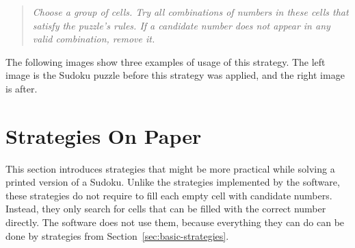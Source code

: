 \begin{quote}
    \textit{
        Choose a group of cells.
        Try all combinations of numbers in these cells that satisfy the puzzle's rules.
        If a candidate number does not appear in any valid combination, remove it.
    }
\end{quote}

The following images show three examples of usage of this strategy.
The left image is the Sudoku puzzle before this strategy was applied, and the right image is after.




\section{Strategies On Paper}\label{sec:paper}

This section introduces strategies that might be more practical while solving a printed version of a Sudoku.
Unlike the strategies implemented by the software,
these strategies do not require to fill each empty cell with candidate numbers.
Instead, they only search for cells that can be filled with the correct number directly.
The software does not use them,
because everything they can do can be done by strategies from Section~\ref{sec:basic-strategies}.

